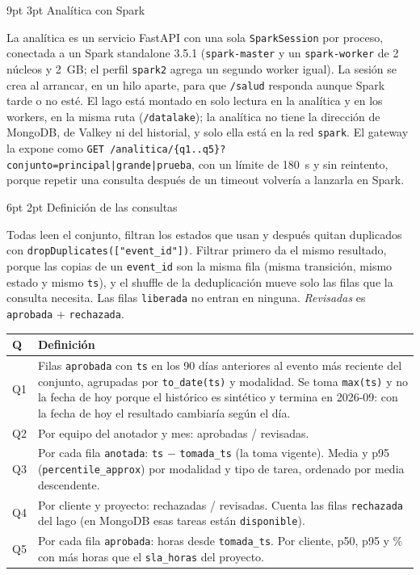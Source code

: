 \documentclass[10pt,letterpaper]{article}
\makeatletter
\renewcommand\section{\@startsection{section}{1}{\z@}%
  {9pt \@plus 2pt \@minus 1pt}{3pt}%
  {\normalfont\large\bfseries\color{acc}}}
\renewcommand\subsection{\@startsection{subsection}{2}{\z@}%
  {6pt \@plus 1pt}{2pt}%
  {\normalfont\normalsize\bfseries\color{acc}}}
\makeatother
\begin{document}
\section{Analítica con Spark}

La analítica es un servicio FastAPI con una sola \texttt{SparkSession} por proceso, conectada a un Spark
standalone 3.5.1 (\texttt{spark-master} y un \texttt{spark-worker} de 2 núcleos y 2~GB; el perfil
\texttt{spark2} agrega un segundo worker igual). La sesión se crea al arrancar, en un hilo aparte, para que
\texttt{/salud} responda aunque Spark tarde o no esté. El lago está montado en solo lectura en la analítica y
en los workers, en la misma ruta (\texttt{/datalake}); la analítica no tiene la dirección de MongoDB, de
Valkey ni del historial, y solo ella está en la red \texttt{spark}. El gateway la expone como
\texttt{GET /analitica/\{q1..q5\}?conjunto=principal|grande|prueba}, con un límite de 180~s y sin reintento,
porque repetir una consulta después de un timeout volvería a lanzarla en Spark.

\subsection{Definición de las consultas}

Todas leen el conjunto, filtran los estados que usan y después quitan duplicados con
\texttt{dropDuplicates(["event\_id"])}. Filtrar primero da el mismo resultado, porque las copias de un
\texttt{event\_id} son la misma fila (misma transición, mismo estado y mismo \texttt{ts}), y el shuffle de
la deduplicación mueve solo las filas que la consulta necesita. Las filas \texttt{liberada} no entran en
ninguna. \emph{Revisadas} es \texttt{aprobada} + \texttt{rechazada}.

\begin{center}\footnotesize
\begin{tabular}{@{}l>{\raggedright\arraybackslash}p{}@{}}
\toprule
Q & Definición \\
\midrule
Q1 & Filas \texttt{aprobada} con \texttt{ts} en los 90 días anteriores al evento más reciente del conjunto,
agrupadas por \texttt{to\_date(ts)} y modalidad. Se toma \texttt{max(ts)} y no la fecha de hoy porque el
histórico es sintético y termina en 2026-09: con la fecha de hoy el resultado cambiaría según el día. \\
Q2 & Por equipo del anotador y mes: aprobadas / revisadas. \\
Q3 & Por cada fila \texttt{anotada}: \texttt{ts} $-$ \texttt{tomada\_ts} (la toma vigente). Media y p95
(\texttt{percentile\_approx}) por modalidad y tipo de tarea, ordenado por media descendente. \\
Q4 & Por cliente y proyecto: rechazadas / revisadas. Cuenta las filas \texttt{rechazada} del lago (en
MongoDB esas tareas están \texttt{disponible}). \\
Q5 & Por cada fila \texttt{aprobada}: horas desde \texttt{tomada\_ts}. Por cliente, p50, p95 y \% con más
horas que el \texttt{sla\_horas} del proyecto. \\
\bottomrule
\end{tabular}
\end{center}
\end{document}
